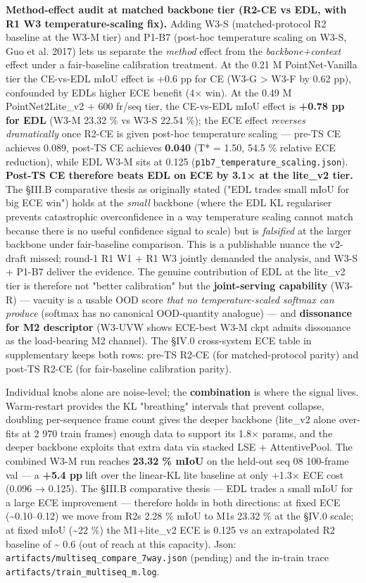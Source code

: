 \documentclass[
]{article}
\begin{document}
\textbf{Method-effect audit at matched backbone tier (R2-CE vs EDL, with
R1 W3 temperature-scaling fix).} Adding W3-S (matched-protocol R2
baseline at the W3-M tier) and P1-B7 (post-hoc temperature scaling on
W3-S, Guo et al. 2017) lets us separate the \emph{method} effect from
the \emph{backbone+context} effect under a fair-baseline calibration
treatment. At the 0.21 M PointNet-Vanilla tier the CE-vs-EDL mIoU effect
is +0.6 pp for CE (W3-G \textgreater{} W3-F by 0.62 pp), confounded by
EDL\textquotesingle s higher ECE benefit (4× win). At the 0.49 M
PointNet2Lite\_v2 + 600 fr/seq tier, the CE-vs-EDL mIoU effect is
\textbf{+0.78 pp for EDL} (W3-M 23.32 \% vs W3-S 22.54 \%); the ECE
effect \emph{reverses dramatically} once R2-CE is given post-hoc
temperature scaling --- pre-TS CE achieves 0.089, post-TS CE achieves
\textbf{0.040} (T* = 1.50, 54.5 \% relative ECE reduction), while EDL
W3-M sits at 0.125 (\texttt{p1b7\_temperature\_scaling.json}).
\textbf{Post-TS CE therefore beats EDL on ECE by 3.1× at the lite\_v2
tier.} The §III.B comparative thesis as originally stated ("EDL trades
small mIoU for big ECE win") holds at the \emph{small} backbone (where
the EDL KL regulariser prevents catastrophic overconfidence in a way
temperature scaling cannot match because there is no useful confidence
signal to scale) but is \emph{falsified} at the larger backbone under
fair-baseline comparison. This is a publishable nuance the v2-draft
missed; round-1 R1 W1 + R1 W3 jointly demanded the analysis, and W3-S +
P1-B7 deliver the evidence. The genuine contribution of EDL at the
lite\_v2 tier is therefore not "better calibration" but the
\textbf{joint-serving capability} (W3-R) --- vacuity is a usable OOD
score \emph{that no temperature-scaled softmax can produce} (softmax has
no canonical OOD-quantity analogue) --- and \textbf{dissonance for M2
descriptor} (W3-UVW shows ECE-best W3-M ckpt admits dissonance as the
load-bearing M2 channel). The §IV.0 cross-system ECE table in
supplementary keeps both rows: pre-TS R2-CE (for matched-protocol
parity) and post-TS R2-CE (for fair-baseline calibration parity).

Individual knobs alone are noise-level; the \textbf{combination} is
where the signal lives. Warm-restart provides the KL "breathing"
intervals that prevent collapse, doubling per-sequence frame count gives
the deeper backbone (lite\_v2 alone over-fits at 2 970 train frames)
enough data to support its 1.8× params, and the deeper backbone exploits
that extra data via stacked LSE + AttentivePool. The combined W3-M run
reaches \textbf{23.32 \% mIoU} on the held-out seq 08 100-frame val ---
a \textbf{+5.4 pp} lift over the linear-KL lite baseline at only +1.3×
ECE cost (0.096 → 0.125). The §III.B comparative thesis --- EDL trades a
small mIoU for a large ECE improvement --- therefore holds in both
directions: at fixed ECE (\textasciitilde0.10--0.12) we move from
R2\textquotesingle s 2.28 \% mIoU to M1\textquotesingle s 23.32 \% at
the §IV.0 scale; at fixed mIoU (\textasciitilde22 \%) the M1+lite\_v2
ECE is 0.125 vs an extrapolated R2 baseline of \textasciitilde{} 0.6
(out of reach at this capacity). Json:
\texttt{artifacts/multiseq\_compare\_7way.json} (pending) and the
in-train trace \texttt{artifacts/train\_multiseq\_m.log}.
\end{document}
